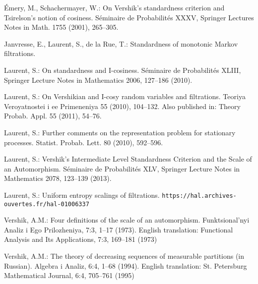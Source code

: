\documentclass[12pt,a4paper]{article}
\begin{document}
\begin{thebibliography}{99.}

 \'{E}mery, M.,  Schachermayer, W.: 
On Vershik's standardness criterion and Tsirelson's  notion of cosiness. 
 S\'eminaire de Probabilit\'es XXXV,  
Springer Lectures Notes in Math. 1755 (2001), 
265--305.

Janvresse, E., Laurent, S., de la Rue, T.:
Standardness of monotonic Markov filtrations. 


 Laurent, S.: 
On standardness and I-cosiness. S\'eminaire de Probabilit\'es XLIII, 
Springer Lecture Notes in Mathematics 2006, 
127--186 (2010).

 Laurent, S.: 
On Vershikian and I-cosy random variables and filtrations.
Teoriya Veroyatnostei i ee Primeneniya 55 (2010), 104--132. 
Also published in: Theory Probab. Appl. 55 (2011), 54--76.

Laurent, S.: 
Further comments on the representation problem for stationary processes. 
Statist. Probab. Lett. 80 (2010),  592--596. 

Laurent, S.: 
Vershik's Intermediate Level Standardness Criterion and the Scale of an Automorphism. 
S\'eminaire de Probabilit\'es XLV,
Springer Lecture Notes in Mathematics 2078,
123--139 (2013).

Laurent, S.: 
Uniform entropy scalings of filtrations. 
\verb+https://hal.archives-ouvertes.fr/hal-01006337+ 

Vershik, A.M.: 
Four definitions of the scale of an automorphism. 
Funktsional'nyi Analiz i Ego Prilozheniya, 7:3, 
1--17 (1973). 
English translation:    
Functional Analysis and Its Applications, 7:3, 169--181 (1973)

Vershik, A.M.: 
The theory of decreasing sequences of measurable partitions (in Russian). 
 Algebra i Analiz,  6:4, 1--68 (1994). 
English translation:  St. Petersburg Mathematical Journal, 6:4, 705--761 (1995)


\end{thebibliography}
\end{document}
